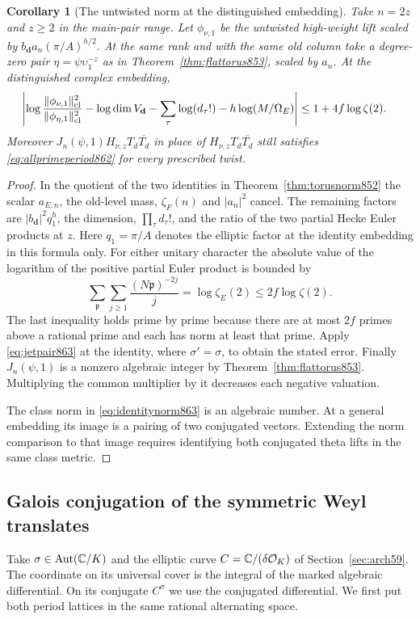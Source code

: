 \documentclass[a4paper,11pt]{article}
\newtheorem{corollary}[proposition]{Corollary}
\theoremstyle{definition}
\theoremstyle{remark}
\numberwithin{equation}{section}
\begin{document}
\begin{corollary}[The untwisted norm at the distinguished embedding]
\leavevmode\label{cor:identitynorm863}
Take \(n=2z\) and \(z\ge2\) in the main-pair range. Let
\(\phi_{\nu,1}\) be the untwisted high-weight lift scaled by
\(b_{\mathbf d}a_n(\pi/A)^{h/2}\). At the same rank and with
the same old column take a degree-zero pair
\(\eta=\psi\upsilon_1^{-z}\) as in Theorem~\ref{thm:flattorus853},
scaled by \(a_n\). At the distinguished complex embedding,
\begin{align}
 \left|\log\frac{\|\phi_{\nu,1}\|_{\rm cl}^2}
                     {\|\phi_{\eta,1}\|_{\rm cl}^2}
       -\log\dim V_{\mathbf d}
       -\sum_\tau\log(d_\tau!)
       -h\log(M/\Omega_E)\right|
       &\le 1+4f\log\zeta(2).
 \label{eq:identitynorm863}
\end{align}
Moreover \(J_n(\psi,1)H_{\nu,z}T_d\overline{T_d}\) in place
of \(H_{\nu,z}T_d\overline{T_d}\) still satisfies
\eqref{eq:allprimeperiod862} for every prescribed twist.
\end{corollary}
\begin{proof}
In the quotient of the two identities in Theorem~\ref{thm:torusnorm852}
the scalar \(a_{E,n}\), the old-level mass, \(\zeta_F(n)\) and
\(|a_n|^2\) cancel. The remaining factors are
\(|b_{\mathbf d}|^2 q_1^{h}\), the dimension,
\(\prod_\tau d_\tau!\), and the ratio of the two partial Hecke
Euler products at \(z\). Here \(q_1=\pi/A\) denotes the elliptic
factor at the identity embedding in this formula only.
For either unitary character the absolute value of the logarithm
of the positive partial Euler product is bounded by
\[
 \sum_{\mathfrak p}\sum_{j\ge1}
            \frac{(N\mathfrak p)^{-2j}}{j}
       =\log\zeta_E(2)\le 2f\log\zeta(2).
\]
The last inequality holds prime by prime because there are at
most \(2f\) primes above a rational prime and each has norm at
least that prime. Apply \eqref{eq:jetpair863} at the identity,
where \(\sigma'=\sigma\), to obtain the stated error. Finally
\(J_n(\psi,1)\) is a nonzero algebraic integer by
Theorem~\ref{thm:flattorus853}. Multiplying the common multiplier
by it decreases each negative valuation.

The class norm in \eqref{eq:identitynorm863} is an algebraic
number. At a general embedding its image is a pairing of two
conjugated vectors. Extending the norm comparison to that image
requires identifying both conjugated theta lifts in the same
class metric.
\end{proof}
\clearpage

\subsection{Galois conjugation of the symmetric Weyl translates}
\label{sec:weyltransport864}
Take \(\sigma\in\operatorname{Aut}(\mathbb C/K)\) and the elliptic
curve \(C=\mathbb C/(\delta\mathcal O_K)\) of Section~\ref{sec:arch59}.
The coordinate on its universal cover is the integral of the
marked algebraic differential. On its conjugate \(C^\sigma\)
we use the conjugated differential. We first put both period
lattices in the same rational alternating space.
\end{document}
